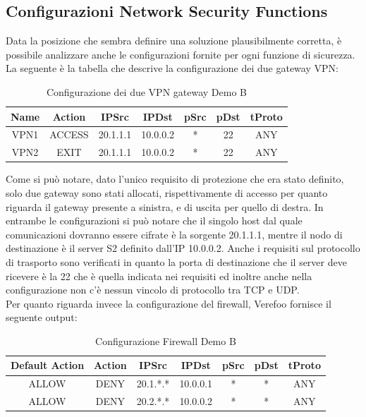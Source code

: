\subsection{Configurazioni Network Security Functions}
Data la posizione che sembra definire una soluzione plausibilmente corretta, è possibile analizzare anche le configurazioni fornite per ogni funzione di sicurezza.
La seguente è la tabella che descrive la configurazione dei due gateway VPN:

\begin{table}[H]
    \centering
    \begin{tabular}{ccccccc}
        \hline
         Name & Action & IPSrc & IPDst & pSrc & pDst & tProto \\
        \hline
        VPN1 & ACCESS & 20.1.1.1 & 10.0.0.2 & * & 22 & ANY \\
        VPN2 & EXIT & 20.1.1.1 & 10.0.0.2 & * & 22 & ANY \\
        \hline
    \end{tabular}
    \caption{Configurazione dei due VPN gateway Demo B}
    \label{tab:tabella}
\end{table}

Come si può notare, dato l'unico requisito di protezione che era stato definito, solo due gateway sono stati allocati, rispettivamente di accesso per quanto riguarda il gateway presente a sinistra, e di uscita per quello di destra.
In entrambe le configurazioni si può notare che il singolo host dal quale comunicazioni dovranno essere cifrate è la sorgente 20.1.1.1, mentre il nodo di destinazione è il server S2 definito dall'IP 10.0.0.2. Anche i requisiti sul protocollo di trasporto
sono verificati in quanto la porta di destinazione che il server deve ricevere è la 22 che è quella indicata nei requisiti ed inoltre anche nella configurazione non c'è nessun vincolo di protocollo tra TCP e UDP.\\
Per quanto riguarda invece la configurazione del firewall, Verefoo fornisce il seguente output:

\begin{table}[H]
    \centering
    \begin{tabular}{ccccccc}
        \hline
        Default Action & Action & IPSrc & IPDst & pSrc & pDst & tProto \\
        \hline
        ALLOW & DENY & 20.1.*.* & 10.0.0.1 & * & * & ANY \\
        ALLOW & DENY & 20.2.*.* & 10.0.0.2 & * & * & ANY  \\
        \hline
    \end{tabular}
    \caption{Configurazione Firewall Demo B}
    \label{tab:tabella}
\end{table}

